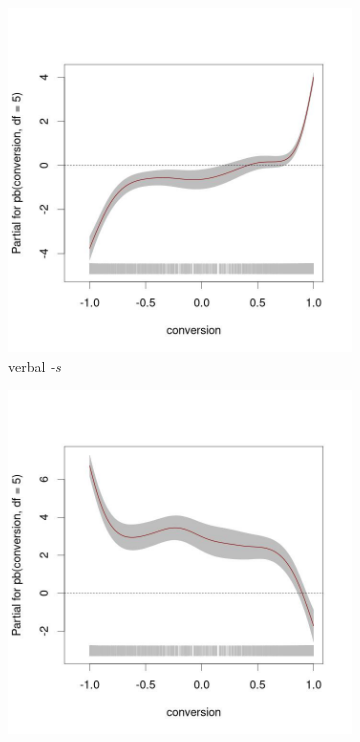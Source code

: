 \documentclass[
]{article}
\begin{document}
\begin{figure}[t!]
     \centering
     \begin{subfigure}[b]{0.49\textwidth}
         \centering
         \includegraphics[width=\textwidth]{figures/m_verb_nu_conversion.jpg}
         \caption{verbal \textit{-s}}
         \label{verb_nu_conv}
     \end{subfigure}
     \hfill
     \begin{subfigure}[b]{0.49\textwidth}
         \centering
         \includegraphics[width=\textwidth]{figures/m_noun_nu_conversion.jpg}

\end{subfigure}
\end{figure}
\end{document}
